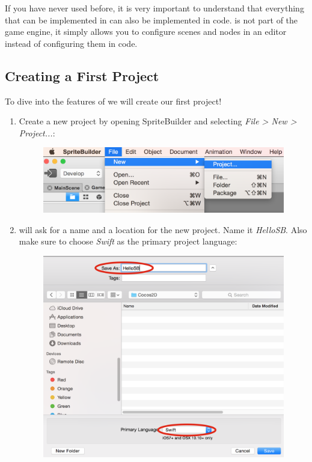 If you have never used \SB{} before, it is very important to understand that
everything that can be implemented in \SB{} can also be implemented in code.
\SB{} is not part of the game engine, it simply allows you to configure \cocos{}
scenes and nodes in an editor instead of configuring them in code.

\subsection{Creating a First Project}
To dive into the features of \SB{} we will create our first project! 

\begin{leftbar}
\begin{enumerate}
  \item Create a new project by opening SpriteBuilder and selecting \textit{File > New >
Project...}:
\begin{figure}[H]
    \centering
    \includegraphics[width=0.9\linewidth]{images/cocos2d/setup/spritebuilder_new_project.png}     
\end{figure}

  \item \SB{} will ask for a name and a location for the new project. Name it
\textit{HelloSB}. Also make sure to choose \textit{Swift} as the primary project
language:
\begin{figure}[H]
    \centering
    \includegraphics[width=0.9\linewidth]{images/Chapter1/new_project_swift.png}     
\end{figure} 
\end{enumerate}
\end{leftbar}

